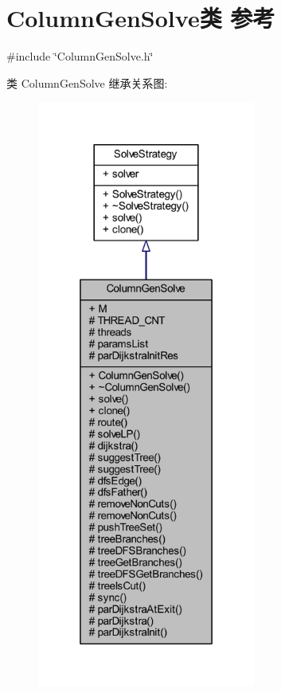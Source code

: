\hypertarget{classColumnGenSolve}{}\section{Column\+Gen\+Solve类 参考}
\label{classColumnGenSolve}


{\ttfamily \#include \char`\"{}Column\+Gen\+Solve.\+h\char`\"{}}



类 Column\+Gen\+Solve 继承关系图\+:
\nopagebreak
\begin{figure}[H]
\begin{center}
\leavevmode
\includegraphics[height=550pt]{classColumnGenSolve__inherit__graph}
\end{center}
\end{figure}


